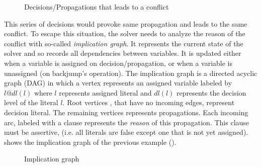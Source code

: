 \begin{figure}[!htbp]
 \centering
  
 \caption{Decisions/Propagations that leads to a  conflict}
 \label{fig:conflict}
\end{figure}
This series of decisions would provoke same propagation and leads to the same conflict. To escape this
situation, the solver needs to analyze the reason of the conflict with so-called \emph{implication graph}.
It represents the current state of the solver and so records all dependencies between  variables. It is updated either when a variable is assigned on decision/propagation, or  when a variable
is unassigned (on backjump's operation). The implication graph is a directed acyclic graph (DAG) in which a vertex represents an assigned variable labeled by $l@dl(l)$ where $l$ represents assigned literal and $dl(l)$ represents the decision level of the literal $l$.
Root vertices , that have no incoming edges, represent decision literal. The remaining vertices represents
propagations.
Each incoming arc, labeled with a clause represents the \emph{reason} of this propagation.
This clause must be assertive, (i.e. all  literals are false except one that is not yet assigned).
 shows the implication graph of the previous example ().
\begin{figure}[!htbp]
 \centering
 
 \caption{Implication graph}
 \label{fig:implication-graph}
\end{figure}

